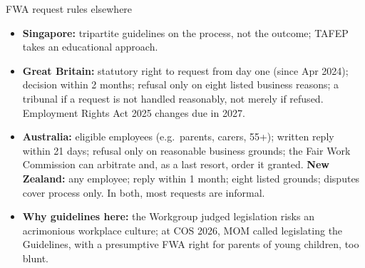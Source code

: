 \begin{frame}[t,label=B-legal]{FWA request rules elsewhere}
  \FrameTop
  \begin{itemize}\setlength{\itemsep}{0.10cm}
    \item \textbf{Singapore:} tripartite guidelines on the process, not the outcome; TAFEP takes an educational approach.
    \item \textbf{Great Britain:} statutory right to request from day one (since Apr 2024); decision within 2 months; refusal only on eight listed business reasons; a tribunal if a request is not handled reasonably, not merely if refused. Employment Rights Act 2025 changes due in 2027.
    \item \textbf{Australia:} eligible employees (e.g.\ parents, carers, 55+); written reply within 21 days; refusal only on reasonable business grounds; the Fair Work Commission can arbitrate and, as a last resort, order it granted. \textbf{New Zealand:} any employee; reply within 1 month; eight listed grounds; disputes cover process only. In both, most requests are informal.
    \item \textbf{Why guidelines here:} the Workgroup judged legislation risks an acrimonious workplace culture; at COS 2026, MOM called legislating the Guidelines, with a presumptive FWA right for parents of young children, too blunt.
  \end{itemize}
\end{frame}

